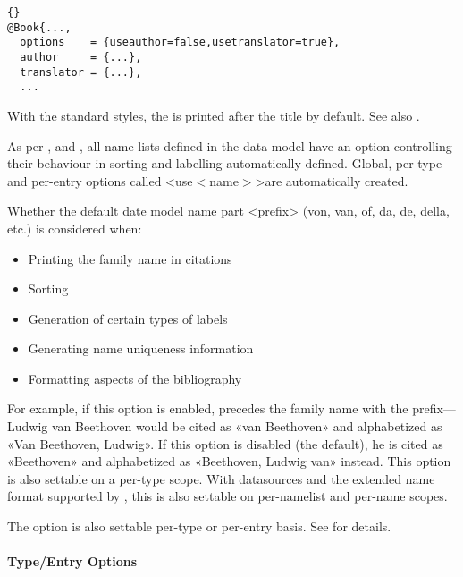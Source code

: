\documentclass{ltxdockit}[2011/03/25]
\newcommand*{\biber}{\sty{biber}\xspace}
\newcommand*{\biblatex}{\sty{biblatex}\xspace}
\newcommand*{\biblatexml}{\sty{biblatexml}\xspace}
\begin{document}
\begin{optionlist}
\begin{lstlisting}[style=bibtex]{}
@Book{...,
  options    = {useauthor=false,usetranslator=true},
  author     = {...},
  translator = {...},
  ...
\end{lstlisting}
%
With the standard styles, the  is printed after the title by default. See also .


As per ,  and , all name lists defined in the data model have an option controlling their behaviour in sorting and labelling automatically 
defined. Global, per-type and per-entry options called <use$<$name$>$>are automatically created. 


Whether the default date model name part <prefix> (von, van, of, da, de, della, etc.) is considered when:

\begin{itemize}
\item Printing the family name in citations
\item Sorting
\item Generation of certain types of labels
\item Generating name uniqueness information
\item Formatting aspects of the bibliography
\end{itemize}
%
For example, if this option is enabled, \biblatex precedes the family name with the prefix---Ludwig van Beethoven would be cited as «van Beethoven» and alphabetized as «Van Beethoven, Ludwig». If this option is disabled (the default), he is cited as «Beethoven» and alphabetized as «Beethoven, Ludwig van» instead.
This option is also settable on a per-type scope. With \biblatexml datasources and the \bibtex extended name format supported by \biber, this is also settable on per-namelist and per-name scopes.


The  option is also settable per-type or per-entry basis. See  for details.

\end{optionlist}

\paragraph{Type/Entry Options}
\label{use:opt:bib:ded}
\end{document}

